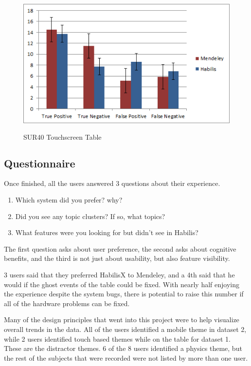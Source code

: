 \documentclass{article}
\begin{document}
\begin{figure}[ht!]
\centering
\scalebox{1}
{\includegraphics{BarChartSquare.png}}
\caption{SUR40 Touchscreen Table}
\label{Fig:barChart}
\end{figure}



\subsection*{Questionnaire}
Once finished, all the users answered 3 questions about their experience.  
	\begin{enumerate}
	\item Which system did you prefer? why?
	\item Did you see any topic clusters?  If so, what topics?
	\item What features were you looking for but didn't see in Habilis?
	\end{enumerate}

The first question asks about user preference, the second asks about cognitive benefits, and the third is not just about usability, but also feature visibility.  

	3 users said that they preferred HabilisX to Mendeley, and a 4th said that he would if the ghost events of the table could be fixed.  With nearly half enjoying the experience despite the system bugs, there is potential to raise this number if all of the hardware problems can be fixed.  
	
	Many of the design principles that went into this project were to help visualize overall trends in the data.  All of the users identified a mobile theme in dataset 2, while 2 users identified touch based themes while on the table for dataset 1.    These are the distractor themes.  6 of the 8 users identified a physics theme, but the rest of the subjects that were recorded were not listed by more than one user.  
	
\end{document}
